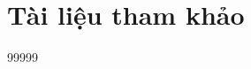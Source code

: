 \documentclass[a4paper,table]{article}
\theoremstyle{definition}
\begin{document}
\renewcommand\refname{}
\newpage
\section*{Tài liệu tham khảo}
\begin{thebibliography}{99999}

\end{thebibliography}
\end{document}
